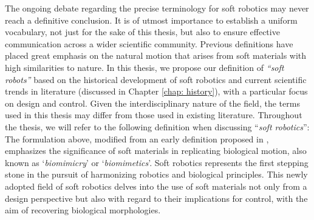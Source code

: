 \par The ongoing debate regarding the precise terminology for soft robotics may never reach a definitive conclusion. It is of utmost importance to establish a uniform vocabulary, not just for the sake of this thesis, but also to ensure effective communication across a wider scientific community. Previous definitions have placed great emphasis on the natural motion that arises from soft materials with high similarities to nature. In this thesis, we propose our definition of \textit{``soft robots''} based on the historical development of soft robotics and current scientific trends in literature (discussed in Chapter \ref{chap: history}), with a particular focus on design and control. Given the interdisciplinary nature of the field, the terms used in this thesis may differ from those used in existing literature. Throughout the thesis, we will refer to the following definition when discussing ``\emph{soft robotics}'':
%
%
The formulation above, modified from an early definition proposed in \cite{DellaSantina2020Springer}, emphasizes the significance of soft materials in replicating biological motion, also known as `\textit{biomimicry}'  or `\textit{biomimetics}'. Soft robotics represents the first stepping stone in the pursuit of harmonizing robotics and biological principles. This newly adopted field of soft robotics delves into the use of soft materials not only from a design perspective but also with regard to their implications for control, with the aim of recovering biological morphologies.

